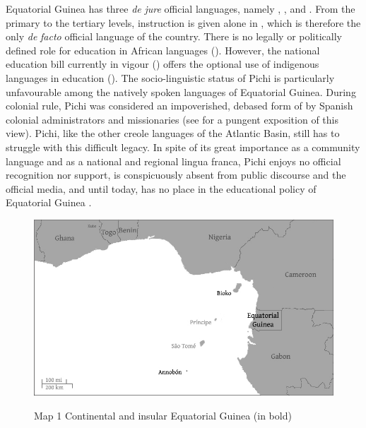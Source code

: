 Equatorial Guinea has three \textit{de} \textit{jure} official languages, namely , , and . From the primary to the tertiary levels, instruction is given alone in , which is therefore the only \textit{de} \textit{facto} official language of the country. There is no legally or politically defined role for education in African languages (\citealt{Yakpo2011,Yakpo2016estatuto}). However, the national education bill currently in vigour (\citealt{RepublicadeGuineaEcuatorial2007}) offers the optional use of indigenous languages in education (\citealt{OloFernandes2012}). The socio-linguistic status of Pichi is particularly unfavourable among the natively spoken languages of Equatorial Guinea. During colonial rule, Pichi was considered an impoverished, debased form of  by Spanish colonial administrators and missionaries (see \citealt[5–7]{Zarco1938} for a pungent exposition of this view). Pichi, like the other creole languages of the Atlantic Basin, still has to struggle with this difficult legacy. In spite of its great importance as a community language and as a national and regional lingua franca, Pichi enjoys no official recognition nor support, is conspicuously absent from public discourse and the official media, and until today, has no place in the educational policy of Equatorial Guinea \citep{Yakpo2016estatuto}.

\begin{figure}
	\caption{Map 1 Continental and insular Equatorial Guinea (in bold)}
	\includegraphics[width=\textwidth]{figures/yakpomod-img1.png}
	\label{map:1:1.1}
\end{figure}

